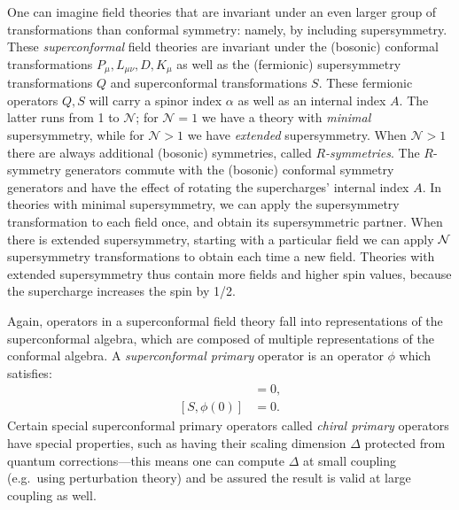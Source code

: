 \documentclass[12pt]{article}
\renewcommand{\^}[1]{\hat{#1}}
\begin{document}
One can imagine field theories that are invariant under an even larger group of transformations than conformal symmetry: namely, by including supersymmetry. These \emph{superconformal} field theories are invariant under the (bosonic) conformal transformations $P_{\mu},L_{\mu\nu},D,K_{\mu}$ as well as the (fermionic) supersymmetry transformations $Q$ and superconformal transformations $S$. These fermionic operators $Q,S$ will carry a spinor index $\alpha$ as well as an internal index $A$. The latter runs from 1 to $\mathcal{N}$; for $\mathcal{N}=1$ we have a theory with \emph{minimal} supersymmetry, while for $\mathcal{N}>1$ we have \emph{extended} supersymmetry. When $\mathcal{N}>1$ there are always additional (bosonic)  symmetries, called \emph{$R$-symmetries}. The $R$-symmetry generators commute with the (bosonic) conformal symmetry generators and have the effect of rotating the supercharges' internal index $A$. 
In theories with minimal supersymmetry, we can apply the supersymmetry transformation to each field once, and obtain its supersymmetric partner. When there is extended supersymmetry, starting with a particular field we can apply ${\cal N}$ supersymmetry transformations to obtain each time a new field. Theories with extended supersymmetry thus contain more fields and higher spin values, because the supercharge increases the spin by 1/2.

 Again, operators in a superconformal field theory fall into representations of the superconformal algebra, which are composed of multiple representations of the conformal algebra. A \emph{superconformal primary} operator is an operator $\phi$ which satisfies:
\begin{align}
 [K_{\mu},\phi(0)] &=0,\\
 [S,\phi(0)] &=0.
\end{align}
Certain special superconformal primary operators called \emph{chiral primary} operators have special properties, such as having their scaling dimension $\Delta$ protected from quantum corrections---this means one can compute $\Delta$ at small coupling (e.g.~using perturbation theory) and be assured the result is valid at large coupling as well.
\end{document}
